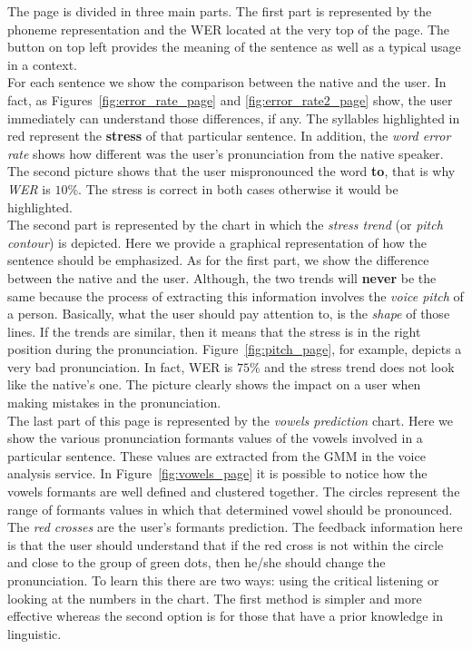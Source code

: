 \noindent The page is divided in three main parts. The first part is represented by the phoneme representation and the WER located at the very top of the page. The button on top left provides the meaning of the sentence as well as a typical usage in a context.\\
\noindent For each sentence we show the comparison between the native and the user. In fact, as Figures~\ref{fig:error_rate_page} and \ref{fig:error_rate2_page} show, the user immediately can understand those differences, if any. The syllables highlighted in red represent the \textbf{stress} of that particular sentence. In addition, the \textit{word error rate} shows how different was the user's pronunciation from the native speaker. The second picture shows that the user mispronounced the word \textbf{to}, that is why \textit{WER} is $10\%$. The stress is correct in both cases otherwise it would be highlighted. \\

\noindent The second part is represented by the chart in which the \textit{stress trend} (or \textit{pitch contour}) is depicted. Here we provide a graphical representation of how the sentence should be emphasized. As for the first part, we show the difference between the native and the user. Although, the two trends will \textbf{never} be the same because the process of extracting this information involves the \textit{voice pitch} of a person. Basically, what the user should pay attention to, is the \textit{shape} of those lines. If the trends are similar, then it means that the stress is in the right position during the pronunciation. Figure~\ref{fig:pitch_page}, for example, depicts a very bad pronunciation. In fact, WER is $75\%$ and the stress trend does not look like the native's one. The picture clearly shows the impact on a user when making mistakes in the pronunciation. \\

\noindent The last part of this page is represented by the \textit{vowels prediction} chart. Here we show the various pronunciation formants values of the vowels involved in a particular sentence. These values are extracted from the GMM in the voice analysis service. In Figure~\ref{fig:vowels_page} it is possible to notice how the vowels formants are well defined and clustered together. The circles represent the range of formants values in which that determined vowel should be pronounced. The \textit{red crosses} are the user's formants prediction. The feedback information here is that the user should understand that if the red cross is not within the circle and close to the group of green dots, then he/she should change the pronunciation. To learn this there are two ways: using the critical listening or looking at the numbers in the chart. The first method is simpler and more effective whereas the second option is for those that have a prior knowledge in linguistic. \\


